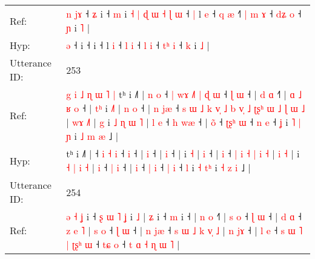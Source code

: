 \documentclass[10pt]{article}
\DeclareRobustCommand{\hl}[1]{{\textcolor{red}{#1}}}
\begin{document}
\begin{longtable}{ll}
Ref: & \hl{n}\hl{ }\hl{j}\hl{ɤ} ˧\hl{ }\hl{ʑ} i ˧\hl{ }\hl{m} i\hl{ }\hl{˧}\hl{ }\hl{|}\hl{ }\hl{ɖ}\hl{ }\hl{ɯ}\hl{ }\hl{˧}\hl{ }\hl{ɭ}\hl{ }\hl{ɯ} ˧\hl{ }\hl{|} l \hl{e} ˧ \hl{q} \hl{æ} ˧\hl{˥}\hl{ }\hl{|} \hl{m} \hl{ɤ} ˧ \hl{d}\hl{ʑ} \hl{o} ˧ \hl{ɲ} i \hl{˥} |
 \\
Hyp: & \hl{}\hl{}\hl{}\hl{ə} ˧\hl{}\hl{} i ˧\hl{}\hl{} i\hl{}\hl{}\hl{}\hl{}\hl{}\hl{}\hl{}\hl{}\hl{}\hl{}\hl{}\hl{}\hl{}\hl{} ˧\hl{}\hl{} l \hl{i} ˧ \hl{l} \hl{i} ˧\hl{}\hl{}\hl{} \hl{l} \hl{i} ˧ \hl{t}\hl{ʰ} \hl{i} ˧ \hl{k} i \hl{˩} |
 \\
\midrule
Utterance ID: & 253 \\
Ref: & \hl{g}\hl{ }\hl{i}\hl{ }\hl{˩}\hl{ }\hl{ɳ}\hl{ }\hl{ɯ}\hl{ }\hl{˥}\hl{ }\hl{|}\hl{ }tʰ i ˩˥ |\hl{ }\hl{n}\hl{ }\hl{o} ˧\hl{ }\hl{|}\hl{ }\hl{w}\hl{ɤ}\hl{ }\hl{˩}\hl{˥} \hl{|} \hl{ɖ} \hl{ɯ} ˧\hl{ }\hl{ɭ} \hl{ɯ} ˧ |\hl{ }\hl{d} \hl{ɑ} ˧\hl{˥} |\hl{ }\hl{ɑ}\hl{ }\hl{˩}\hl{ }\hl{ʁ} \hl{o} ˧ |\hl{ }\hl{t}\hl{ʰ} i \hl{˩}\hl{˥} |\hl{ }\hl{n} \hl{o} ˧ |\hl{ }\hl{n} \hl{j}\hl{æ} ˧\hl{ }\hl{s}\hl{ }\hl{ɯ}\hl{ }\hl{˩}\hl{ }\hl{k}\hl{ }\hl{v}\hl{̩}\hl{ }\hl{˩}\hl{ }\hl{b}\hl{ }\hl{v}\hl{̩}\hl{ }\hl{˩} \hl{ʈ}\hl{ʂ}\hl{ʰ} \hl{ɯ} \hl{˩} \hl{ɭ} \hl{ɯ} \hl{˩} | \hl{w}\hl{ɤ} \hl{˩}\hl{˥} |\hl{ }\hl{g} i \hl{˩} \hl{ɳ} \hl{ɯ} \hl{˥} |\hl{ }\hl{l} \hl{e} ˧ \hl{h} \hl{w}\hl{æ} ˧ | \hl{o}\hl{̃} ˧ \hl{ʈ}\hl{ʂ}\hl{ʰ} \hl{ɯ} ˧ \hl{n} \hl{e} ˧ \hl{ʝ} i \hl{˥} \hl{|}\hl{ }\hl{ɲ} i \hl{˩} \hl{m} \hl{æ} ˩ |
 \\
Hyp: & \hl{}\hl{}\hl{}\hl{}\hl{}\hl{}\hl{}\hl{}\hl{}\hl{}\hl{}\hl{}\hl{}\hl{}tʰ i ˩˥ |\hl{}\hl{}\hl{}\hl{} ˧\hl{}\hl{}\hl{}\hl{}\hl{}\hl{}\hl{}\hl{} \hl{i} \hl{˧} \hl{i} ˧\hl{}\hl{} \hl{i} ˧ |\hl{}\hl{} \hl{i} ˧\hl{} |\hl{}\hl{}\hl{}\hl{}\hl{}\hl{} \hl{i} ˧ |\hl{}\hl{}\hl{} i \hl{}\hl{˧} |\hl{}\hl{} \hl{i} ˧ |\hl{}\hl{} \hl{}\hl{i} ˧\hl{}\hl{}\hl{}\hl{}\hl{}\hl{}\hl{}\hl{}\hl{}\hl{}\hl{}\hl{}\hl{}\hl{}\hl{}\hl{}\hl{}\hl{}\hl{}\hl{} \hl{}\hl{}\hl{|} \hl{i} \hl{˧} \hl{|} \hl{i} \hl{˧} | \hl{}\hl{i} \hl{}\hl{˧} |\hl{}\hl{} i \hl{˧} \hl{|} \hl{i} \hl{˧} |\hl{}\hl{} \hl{i} ˧ \hl{|} \hl{}\hl{i} ˧ | \hl{}\hl{i} ˧ \hl{}\hl{}\hl{|} \hl{i} ˧ \hl{|} \hl{i} ˧ \hl{l} i \hl{˧} \hl{}\hl{t}\hl{ʰ} i \hl{˧} \hl{z} \hl{i} ˩ |
 \\
\midrule
Utterance ID: & 254 \\
Ref: & \hl{ə}\hl{ }\hl{˧}\hl{ }\hl{ʝ} i ˧\hl{ }\hl{ʂ}\hl{ }\hl{ɯ} \hl{˥} \hl{ʝ} i \hl{˩} |\hl{ }\hl{ʑ} i ˧ \hl{m} i ˧ |\hl{ }\hl{n} \hl{o} ˧\hl{˥} |\hl{ }\hl{s} \hl{o} ˧ \hl{ɭ} \hl{ɯ} ˧ |\hl{ }\hl{d} \hl{ɑ} ˧\hl{ }\hl{z}\hl{ }\hl{e}\hl{ }\hl{˥} |\hl{ }\hl{s} \hl{o} ˧ \hl{ɭ} \hl{ɯ} ˧ |\hl{ }\hl{n} \hl{j}\hl{æ} ˧\hl{ }\hl{s}\hl{ }\hl{ɯ}\hl{ }\hl{˩}\hl{ }\hl{k}\hl{ }\hl{v}\hl{̩}\hl{ }\hl{˩} |\hl{ }\hl{n} \hl{j}\hl{ɤ} ˧ |\hl{ }\hl{l} \hl{e} ˧\hl{ }\hl{s}\hl{ }\hl{ɯ}\hl{ }\hl{˥}\hl{ }\hl{|} \hl{ʈ}\hl{ʂ}\hl{ʰ} \hl{ɯ} ˧ \hl{t}\hl{ɕ} \hl{o} ˧ \hl{t} \hl{ɑ} \hl{˧} \hl{ɳ} \hl{ɯ} \hl{˥} |

\end{longtable}
\end{document}
